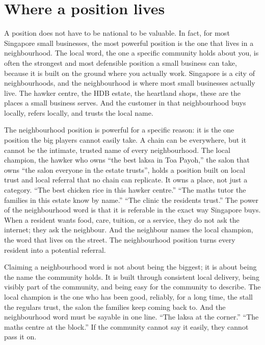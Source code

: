\documentclass[10pt,twoside,openany]{memoir}
\begin{document}
{\FloatBarrier
\chapter{Where a position lives}\label{where-a-position-lives}

A position does not have to be national to be valuable. In fact, for
most Singapore small businesses, the most powerful position is the one
that lives in a neighbourhood. The local word, the one a specific
community holds about you, is often the strongest and most defensible
position a small business can take, because it is built on the ground
where you actually work. Singapore is a city of neighbourhoods, and the
neighbourhood is where most small businesses actually live. The hawker
centre, the HDB estate, the heartland shops, these are the places a
small business serves. And the customer in that neighbourhood buys
locally, refers locally, and trusts the local name.

The neighbourhood position is powerful for a specific reason: it is the
one position the big players cannot easily take. A chain can be
everywhere, but it cannot be the intimate, trusted name of every
neighbourhood. The local champion, the hawker who owns ``the best laksa
in Toa Payoh,'' the salon that owns ``the salon everyone in the estate
trusts'', holds a position built on local trust and local referral that
no chain can replicate. It owns a place, not just a category. ``The best
chicken rice in this hawker centre.'' ``The maths tutor the families in
this estate know by name.'' ``The clinic the residents trust.'' The
power of the neighbourhood word is that it is referable in the exact way
Singapore buys. When a resident wants food, care, tuition, or a service,
they do not ask the internet; they ask the neighbour. And the neighbour
names the local champion, the word that lives on the street. The
neighbourhood position turns every resident into a potential referral.

Claiming a neighbourhood word is not about being the biggest; it is
about being the name the community holds. It is built through consistent
local delivery, being visibly part of the community, and being easy for
the community to describe. The local champion is the one who has been
good, reliably, for a long time, the stall the regulars trust, the salon
the families keep coming back to. And the neighbourhood word must be
sayable in one line. ``The laksa at the corner.'' ``The maths centre at
the block.'' If the community cannot say it easily, they cannot pass it
on.

}
\end{document}
